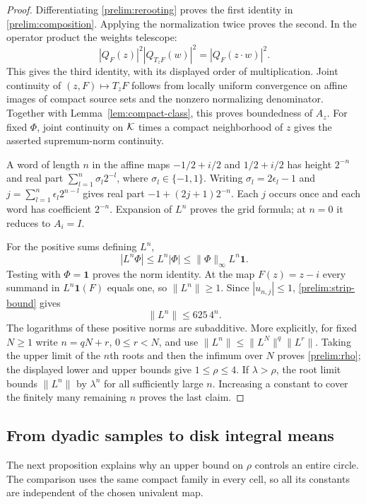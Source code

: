 \begin{proof}
Differentiating \eqref{prelim:rerooting} proves the first identity in
\eqref{prelim:composition}.  Applying the normalization twice proves
the second.  In the operator product the weights telescope:
\[
 |Q_F(z)|^2|Q_{T_zF}(w)|^2=|Q_F(z\cdot w)|^2.
\]
This gives the third identity, with its displayed order of multiplication.
Joint continuity of $(z,F)\mapsto T_zF$ follows from locally uniform
convergence on affine images of compact source sets and the nonzero
normalizing denominator.  Together with Lemma~\ref{lem:compact-class},
this proves boundedness of $A_z$.  For fixed $\Phi$, joint continuity
on $\mathcal K$ times a compact neighborhood of $z$ gives the asserted
supremum-norm continuity.

A word of length $n$ in the affine maps $-1/2+i/2$ and $1/2+i/2$
has height $2^{-n}$ and real part
$\sum_{l=1}^n\sigma_l2^{-l}$, where $\sigma_l\in\{-1,1\}$.
Writing $\sigma_l=2\epsilon_l-1$ and
$j=\sum_{l=1}^n\epsilon_l2^{n-l}$ gives real part
$-1+(2j+1)2^{-n}$.  Each $j$ occurs once and each word has coefficient
$2^{-n}$.  Expansion of $L^n$ proves the grid formula; at $n=0$ it
reduces to $A_i=I$.

For the positive sums defining $L^n$,
\[
 |L^n\Phi|\le L^n|\Phi|\le\|\Phi\|_\infty L^n\mathbf1.
\]
Testing with $\Phi=\mathbf1$ proves the norm identity.  At the map
$F(z)=z-i$ every summand in $L^n\mathbf1(F)$ equals one, so
$\|L^n\|\ge1$.  Since $|u_{n,j}|\le1$,
\eqref{prelim:strip-bound} gives
\[
 \|L^n\|\le625\,4^n.
\]
The logarithms of these positive norms are subadditive.  More explicitly,
for fixed $N\ge1$ write $n=qN+r$, $0\le r<N$, and use
$\|L^n\|\le\|L^N\|^q\|L^r\|$.  Taking the upper limit of the
$n$th roots and then the infimum over $N$ proves
\eqref{prelim:rho}; the displayed lower and upper bounds give
$1\le\rho\le4$.  If $\lambda>\rho$, the root limit bounds
$\|L^n\|$ by $\lambda^n$ for all sufficiently large $n$.  Increasing
a constant to cover the finitely many remaining $n$ proves the last claim.
\end{proof}

\subsection{From dyadic samples to disk integral means}

The next proposition explains why an upper bound on $\rho$ controls an
entire circle.  The comparison uses the same compact family in every
cell, so all its constants are independent of the chosen univalent map.

